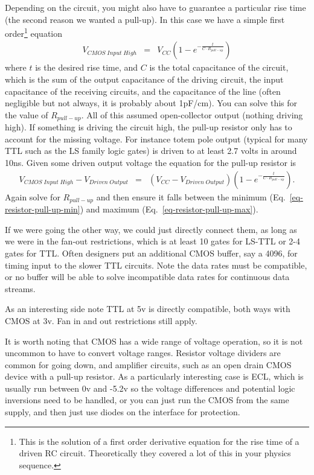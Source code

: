 Depending on the circuit, you might also have to guarantee a particular rise time (the second reason we wanted a pull-up).  In this case we have a simple first order\footnote{This is the solution of a first order derivative equation for the rise time of a driven RC circuit.  Theoretically they covered a lot of this in your physics sequence.} equation
\begin{eqnarray}
V_{CMOS\; Input\; High} &=& V_{CC}\left(1-e^{-\frac{t}{C\cdot R_{pull-up}}}\right)
\end{eqnarray}
where $t$ is the desired rise time, and $C$ is the total capacitance of the circuit, which is the sum of the output capacitance of the driving circuit, the input capacitance of the receiving circuits, and the capacitance of the line (often negligible but not always, it is probably about 1pF/cm).  You can solve this for the value of $R_{pull-up}$.  All of this assumed open-collector output (nothing driving high).  If something is driving the circuit high, the pull-up resistor only has to account for the missing voltage.  For instance totem pole output (typical for many TTL such as the LS family logic gates) is driven to at least 2.7 volts in around 10ns.  Given some driven output voltage the equation for the pull-up resistor is
\begin{eqnarray}
V_{CMOS\; Input\; High}-V_{Driven\; Output} &=& (V_{CC}-V_{Driven\; Output})\left(1-e^{-\frac{t}{C\cdot R_{pull-up}}}\right).
\end{eqnarray}
Again solve for $R_{pull-up}$ and then ensure it falls between the minimum (Eq.~\ref{eq-resistor-pull-up-min}) and maximum (Eq.~\ref{eq-resistor-pull-up-max}).

If we were going the other way, we could just directly connect them, as long as we were in the fan-out restrictions, which is at least 10 gates for LS-TTL or 2-4 gates for TTL.  Often designers put an additional CMOS buffer, say a 4096, for timing input to the slower TTL circuits.  Note the data rates must be compatible, or no buffer will be able to solve incompatible data rates for continuous data streams.

As an interesting side note TTL at 5v is directly compatible, both ways with CMOS at 3v.  Fan in and out restrictions still apply.

It is worth noting that CMOS has a wide range of voltage operation, so it is not uncommon to have to convert voltage ranges.  Resistor voltage dividers are common for going down, and amplifier circuits, such as an open drain CMOS device with a pull-up resistor.  As a particularly interesting case is ECL, which is usually run between 0v and -5.2v so the voltage differences and potential logic inversions need to be handled, or you can just run the CMOS from the same supply, and then just use diodes on the interface for protection. 
